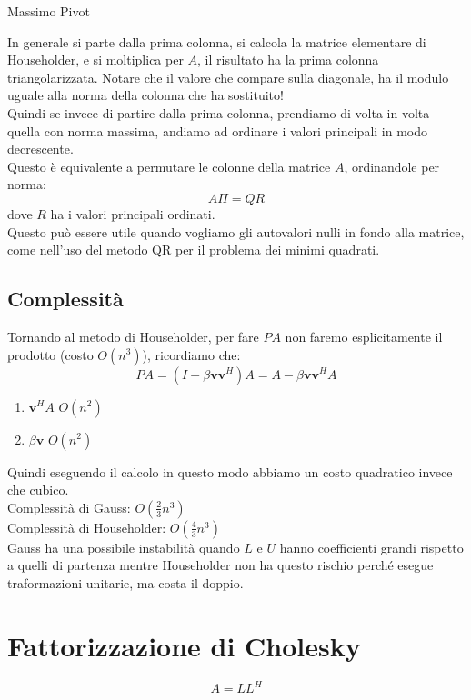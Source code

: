 \begin{subsection}{Massimo Pivot}
\label{qr-max-pivot}
  \begin{workinprogress}
    In generale si parte dalla prima colonna, si calcola la matrice
    elementare di Householder, e si moltiplica per $A$, il risultato ha
    la prima colonna triangolarizzata. Notare che il valore che
    compare sulla diagonale, ha il modulo uguale alla norma della
    colonna che ha sostituito!\\
    Quindi se invece di partire dalla prima colonna, prendiamo di
    volta in volta quella con norma massima, andiamo ad ordinare i
    valori principali in modo decrescente.\\
    Questo è equivalente a permutare le colonne della matrice $A$,
    ordinandole per norma: 
    $$ A \Pi = QR$$
    dove $R$ ha i valori principali ordinati.\\

    Questo può essere utile quando vogliamo gli autovalori nulli in
    fondo alla matrice, come nell'uso del metodo QR per il problema
    dei minimi quadrati.\\
  \end{workinprogress}
\end{subsection}


\subsection{Complessit\`a}
Tornando al metodo di Householder, per fare $PA$ non faremo
esplicitamente il prodotto (costo $O(n^3)$), ricordiamo che:
$$ PA = (I - \beta \mathbf{v}\mathbf{v}^{H})A = A - \beta \mathbf{v}\mathbf{v}^{H}A$$
\begin{enumerate}
\item $\mathbf{v}^{H} A$ \quad $O(n^2)$
\item $\beta \mathbf{v}$ \quad $O(n^2)$
\end{enumerate}
Quindi eseguendo il calcolo in questo modo abbiamo un costo quadratico invece che cubico.\\
Complessit\`a di Gauss: $O(\frac{2}{3} n^{3})$ \\
Complessit\`a di Householder: $O(\frac{4}{3} n^{3})$ \\
Gauss ha una possibile instabilit\`a quando $L$ e $U$ hanno coefficienti
grandi rispetto a quelli di partenza mentre Householder non ha questo
rischio perch\'e esegue traformazioni unitarie, ma costa il doppio.


\section{Fattorizzazione di Cholesky}
\label{sec:fatt-cholesky}
$$ A = LL^{H} $$

